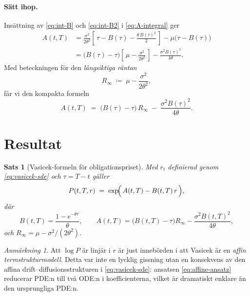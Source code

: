 \documentclass[11pt,a4paper]{article}
\theoremstyle{plain}
\newtheorem{theorem}{Sats}
\theoremstyle{definition}
\theoremstyle{remark}
\newtheorem*{remark}{Anmärkning}
\begin{document}
\paragraph{Sätt ihop.} Insättning av \eqref{eq:int-B} och \eqref{eq:int-B2} i \eqref{eq:A-integral} ger
\begin{align}
    A(t,T)
    &= \frac{\sigma^2}{2\theta^2}\!\left[\,\tau - B(\tau) - \frac{\theta\,B(\tau)^2}{2}\,\right] - \mu\bigl(\tau - B(\tau)\bigr) \nonumber\\[2pt]
    &= \bigl(B(\tau) - \tau\bigr)\!\left[\,\mu - \frac{\sigma^2}{2\theta^2}\,\right] - \frac{\sigma^2 B(\tau)^2}{4\theta}.
\end{align}
Med beteckningen för den \emph{långsiktiga räntan}
\begin{equation}
    R_\infty \;\coloneqq\; \mu - \frac{\sigma^2}{2\theta^2},
    \label{eq:Rinf}
\end{equation}
får vi den kompakta formeln
\begin{equation}
    \boxed{\,A(t,T) \;=\; \bigl(B(\tau) - \tau\bigr)\,R_\infty \;-\; \frac{\sigma^2 B(\tau)^2}{4\theta}.\,}
    \label{eq:A-solution}
\end{equation}

\section{Resultat}

\begin{theorem}[Vasicek-formeln för obligationspriset]
\label{thm:vasicek}
Med $r_t$ definierad genom \eqref{eq:vasicek-sde} och $\tau = T-t$ gäller
\begin{equation}
    P(t,T,r) \;=\; \exp\!\Bigl(\,A(t,T) - B(t,T)\,r\,\Bigr),
    \label{eq:vasicek-price}
\end{equation}
där
\[
    B(t,T) = \frac{1 - e^{-\theta\tau}}{\theta}, \qquad
    A(t,T) = \bigl(B(t,T) - \tau\bigr) R_\infty - \frac{\sigma^2 B(t,T)^2}{4\theta},
\]
och $R_\infty = \mu - \sigma^2/(2\theta^2)$.
\end{theorem}

\begin{remark}
Att $\log P$ är linjär i $r$ är just innebörden i att Vasicek är en \emph{affin termstrukturmodell}. Detta var inte en lycklig gissning utan en konsekvens av den affina drift--diffusionsstrukturen i \eqref{eq:vasicek-sde}: ansatsen \eqref{eq:affine-ansatz} reducerar PDE:n till två ODE:n i koefficienterna, vilket är dramatiskt enklare än den ursprungliga PDE:n.
\end{remark}
\end{document}
